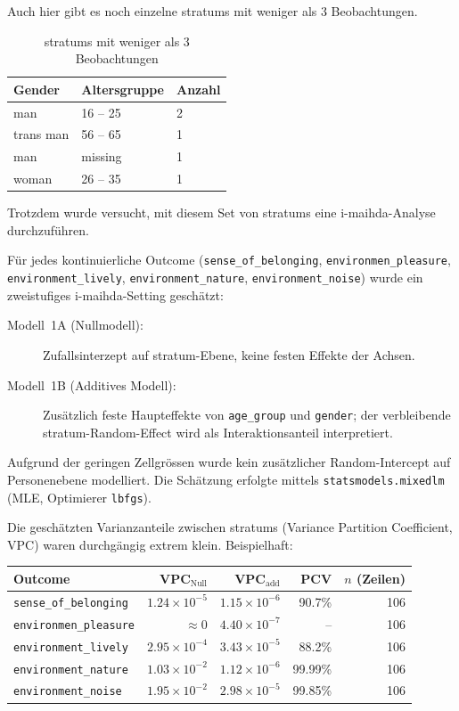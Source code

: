 Auch hier gibt es noch einzelne \glspl{stratum} mit weniger als 3 Beobachtungen.

\begin{table}[h]
    \centering
    \begin{tabular}{lll}
        Gender & Altersgruppe & Anzahl \\
        \hline
        man & 16 -- 25 & 2 \\
        trans man & 56 -- 65 & 1 \\
        man & missing & 1 \\
        woman & 26 -- 35 & 1 \\
    \end{tabular}
    \caption{\glspl{stratum} mit weniger als 3 Beobachtungen}
    \label{tab:zellgroessen_reduzierte_achsen_kleine_strata}
\end{table}

Trotzdem wurde versucht, mit diesem Set von \glspl{stratum} eine \gls{i-maihda}-Analyse durchzuführen.

Für jedes kontinuierliche Outcome (\texttt{sense\_of\_belonging}, \texttt{environmen\_pleasure}, \texttt{environment\_lively}, \texttt{environment\_nature}, \texttt{environment\_noise}) wurde ein zweistufiges \gls{i-maihda}-Setting geschätzt:
\begin{description}
    \item[Modell~1A (Nullmodell):] Zufallsinterzept auf \gls{stratum}-Ebene, keine festen Effekte der Achsen.
    \item[Modell~1B (Additives Modell):] Zusätzlich feste Haupteffekte von \texttt{age\_group} und \texttt{gender}; der verbleibende \gls{stratum}-Random-Effect wird als Interaktionsanteil interpretiert.
\end{description}
Aufgrund der geringen Zellgrössen wurde kein zusätzlicher Random-Intercept auf Personenebene modelliert. Die Schätzung erfolgte mittels \texttt{statsmodels.mixedlm} (MLE, Optimierer \texttt{lbfgs}).


Die geschätzten Varianzanteile zwischen \glspl{stratum} (Variance Partition Coefficient, VPC) waren durchgängig extrem klein. Beispielhaft:

\begin{center}
\begin{tabular}{lrrrr}
\toprule
Outcome & VPC$_{\text{Null}}$ & VPC$_{\text{add}}$ & PCV & $n$ (Zeilen) \\
\midrule
\texttt{sense\_of\_belonging}      & $1.24\times 10^{-5}$ & $1.15\times 10^{-6}$ & 90.7\% & 106 \\
\texttt{environmen\_pleasure}      & $\approx 0$          & $4.40\times 10^{-7}$ & --      & 106 \\
\texttt{environment\_lively}       & $2.95\times 10^{-4}$ & $3.43\times 10^{-5}$ & 88.2\%  & 106 \\
\texttt{environment\_nature}       & $1.03\times 10^{-2}$ & $1.12\times 10^{-6}$ & 99.99\% & 106 \\
\texttt{environment\_noise}        & $1.95\times 10^{-2}$ & $2.98\times 10^{-5}$ & 99.85\% & 106 \\
\bottomrule
\end{tabular}
\end{center}

